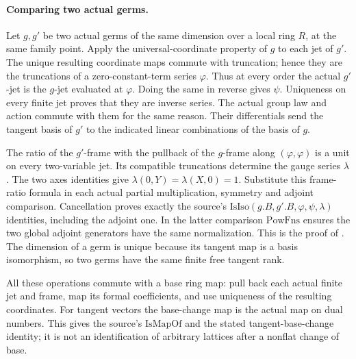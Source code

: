 \paragraph{Comparing two actual germs.}
Let \(g,g'\) be two actual germs of the same dimension
over a local ring \(R\), at the same family point.
Apply the universal-coordinate property of \(g\) to
each jet of \(g'\).
The unique resulting coordinate maps commute with
truncation; hence they are the truncations of a
zero-constant-term series \(\varphi\).
Thus at every order the actual \(g'\)-jet is the
\(g\)-jet evaluated at \(\varphi\).
Doing the same in reverse gives \(\psi\).
Uniqueness on every finite jet proves that they are
inverse series.
The actual group law and action commute with them
for the same reason.
Their differentials send the tangent basis of \(g'\)
to the indicated linear combinations of the basis of \(g\).

The ratio of the \(g'\)-frame with the pullback of the
\(g\)-frame along \((\varphi,\varphi)\) is a unit on
every two-variable jet.
Its compatible truncations determine the gauge series
\(\lambda\).
The two axes identities give \(\lambda(0,Y)=\lambda(X,0)=1\).
Substitute this frame-ratio formula in each actual
partial multiplication, symmetry and adjoint comparison.
Cancellation proves exactly the source's
\(\mathrm{IsIso}(g.B,g'.B,\varphi,\psi,\lambda)\)
identities, including the adjoint one.
In the latter comparison \(\mathrm{PowFns}\) ensures
the two global adjoint generators have the same
normalization.
This is the proof of
.
The dimension of a germ is unique because its tangent
map is a basis isomorphism, so two germs have the
same finite free tangent rank.

All these operations commute with a base ring map:
pull back each actual finite jet and frame, map its
formal coefficients, and use uniqueness of the
resulting coordinates.
For tangent vectors the base-change map is the
actual map on dual numbers.
This gives the source's \(\mathrm{IsMapOf}\) and
the stated tangent-base-change identity; it is not
an identification of arbitrary lattices after a
nonflat change of base.

